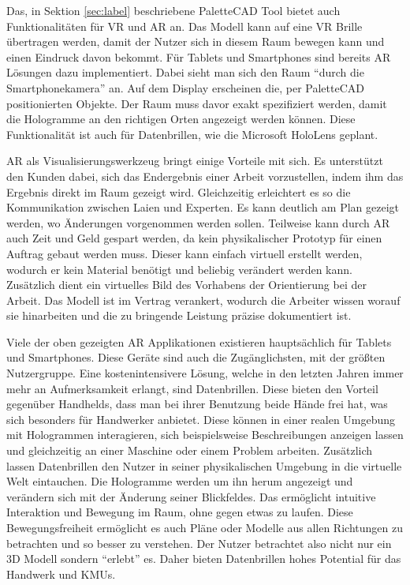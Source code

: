 
Das, in Sektion \ref{sec:label} beschriebene PaletteCAD Tool bietet auch Funktionalitäten für VR und AR an. Das Modell kann auf eine VR Brille übertragen werden, damit der Nutzer sich in diesem Raum bewegen kann und einen Eindruck davon bekommt. Für Tablets und Smartphones sind bereits AR Lösungen dazu implementiert. Dabei sieht man sich den Raum \enquote{durch die Smartphonekamera} an. Auf dem Display erscheinen die, per PaletteCAD positionierten Objekte. Der Raum muss davor exakt spezifiziert werden, damit die Hologramme an den richtigen Orten angezeigt werden können. Diese Funktionalität ist auch für Datenbrillen, wie die Microsoft HoloLens geplant.

AR als Visualisierungswerkzeug bringt einige Vorteile mit sich. Es unterstützt den Kunden dabei, sich das Endergebnis einer Arbeit vorzustellen, indem ihm das Ergebnis direkt im Raum gezeigt wird. Gleichzeitig erleichtert es so die Kommunikation zwischen Laien und Experten. Es kann deutlich am Plan gezeigt werden, wo Änderungen vorgenommen werden sollen. Teilweise kann durch AR auch Zeit und Geld gespart werden, da kein physikalischer Prototyp für einen Auftrag gebaut werden muss. Dieser kann einfach virtuell erstellt werden, wodurch er kein Material benötigt und beliebig verändert werden kann. Zusätzlich dient ein virtuelles Bild des Vorhabens der Orientierung bei der Arbeit. Das Modell ist im Vertrag verankert, wodurch die Arbeiter wissen worauf sie hinarbeiten und die zu bringende Leistung präzise dokumentiert ist.

Viele der oben gezeigten AR Applikationen existieren hauptsächlich für Tablets und Smartphones. Diese Geräte sind auch die Zugänglichsten, mit der größten Nutzergruppe. Eine kostenintensivere Lösung, welche in den letzten Jahren immer mehr an Aufmerksamkeit erlangt, sind Datenbrillen. Diese bieten den Vorteil gegenüber Handhelds, dass man bei ihrer Benutzung beide Hände frei hat, was sich besonders für Handwerker anbietet. Diese können in einer realen Umgebung mit Hologrammen interagieren, sich beispielsweise Beschreibungen anzeigen lassen und gleichzeitig an einer Maschine oder einem Problem arbeiten. Zusätzlich lassen Datenbrillen den Nutzer in seiner physikalischen Umgebung in die virtuelle Welt eintauchen. Die Hologramme werden um ihn herum angezeigt und verändern sich mit der Änderung seiner Blickfeldes. Das ermöglicht intuitive Interaktion und Bewegung im Raum, ohne gegen etwas zu laufen. Diese Bewegungsfreiheit ermöglicht es auch Pläne oder Modelle aus allen Richtungen zu betrachten und so besser zu verstehen. Der Nutzer betrachtet also nicht nur ein 3D Modell sondern \enquote{erlebt} es\cite{klinker_fliesen_2019}. Daher bieten Datenbrillen hohes Potential für das Handwerk und KMUs.